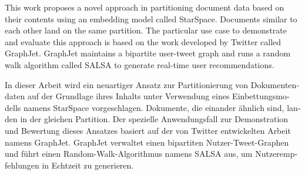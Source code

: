 
\null\vfil
\begin{otherlanguage}{english}
\begin{center}\textsf{\textbf{\abstractname}}\end{center}

\noindent This work proposes a novel approach in partitioning document data based on their contents using an embedding model called StarSpace. Documents similar to each other land on the same partition. The particular use case to demonstrate and evaluate this approach is based on the work developed by Twitter called GraphJet. GraphJet maintains a bipartite user-tweet graph and runs a random walk algorithm called SALSA to generate real-time user recommendations.

\end{otherlanguage}
\vfil\null



\null\vfil
\begin{otherlanguage}{ngerman}
\begin{center}\textsf{\textbf{\abstractname}}\end{center}

\noindent In dieser Arbeit wird ein neuartiger Ansatz zur Partitionierung von Dokumentendaten auf der Grundlage ihres Inhalts unter Verwendung eines Einbettungsmodells namens StarSpace vorgeschlagen. Dokumente, die einander ähnlich sind, landen in der gleichen Partition. Der spezielle Anwendungsfall zur Demonstration und Bewertung dieses Ansatzes basiert auf der von Twitter entwickelten Arbeit namens GraphJet. GraphJet verwaltet einen bipartiten Nutzer-Tweet-Graphen und führt einen Random-Walk-Algorithmus namens SALSA aus, um Nutzerempfehlungen in Echtzeit zu generieren.

\end{otherlanguage}
\vfil\null



